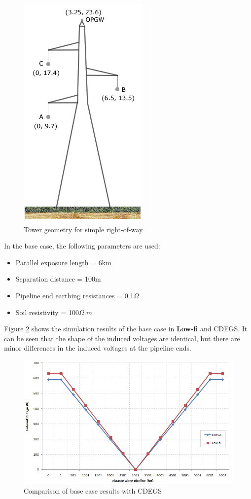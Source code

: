 \documentclass{article}
\begin{document}
\begin{figure}[!htp]
\begin{center}
\caption{Tower geometry for simple right-of-way}
\label{fig:simple_geo}
\includegraphics[width=0.35\linewidth]{./Figures/simple_geo.png}
\end{center}
\end{figure}

In the base case, the following parameters are used:
\begin{itemize}
\item Parallel exposure length = 6km
\item Separation distance = 100m
\item Pipeline end earthing resistances = 0.1$\Omega$
\item Soil resistivity = 100$\Omega.m$
\end{itemize} 

Figure \ref{fig:simple_cdegs} shows the simulation results of the base case in \textbf{Low-fi} and CDEGS. It can be seen that the shape of the induced voltages are identical, but there are minor differences in the induced voltages at the pipeline ends.

\begin{figure}[!htp]
\begin{center}
\caption{Comparison of base case results with CDEGS}
\label{fig:simple_cdegs}
\includegraphics[width=0.8\linewidth]{./Figures/simple_cdegs.png}
\end{center}
\end{figure}
\end{document}
